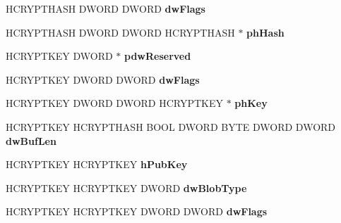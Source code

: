 \begin{DoxyCompactItemize}
\mbox{\label{structtag_p_r_o_v_f_u_n_c_s_a6085b16cb07b46e20649e5b8005e9593}} 
H\+C\+R\+Y\+P\+T\+H\+A\+SH D\+W\+O\+RD D\+W\+O\+RD {\bfseries dw\+Flags}
\item 
\mbox{\label{structtag_p_r_o_v_f_u_n_c_s_a4ac2734584d52da698c7b7cc6686a5df}} 
H\+C\+R\+Y\+P\+T\+H\+A\+SH D\+W\+O\+RD D\+W\+O\+RD H\+C\+R\+Y\+P\+T\+H\+A\+SH $\ast$ {\bfseries ph\+Hash}
\item 
\mbox{\label{structtag_p_r_o_v_f_u_n_c_s_af93daada16a460f279039bfacd00f38a}} 
H\+C\+R\+Y\+P\+T\+K\+EY D\+W\+O\+RD $\ast$ {\bfseries pdw\+Reserved}
\item 
\mbox{\label{structtag_p_r_o_v_f_u_n_c_s_ace287c16bdceea641e3ce7fc519b0694}} 
H\+C\+R\+Y\+P\+T\+K\+EY D\+W\+O\+RD D\+W\+O\+RD {\bfseries dw\+Flags}
\item 
\mbox{\label{structtag_p_r_o_v_f_u_n_c_s_ac38d1bebdec3be33bce14f4bd34ba756}} 
H\+C\+R\+Y\+P\+T\+K\+EY D\+W\+O\+RD D\+W\+O\+RD H\+C\+R\+Y\+P\+T\+K\+EY $\ast$ {\bfseries ph\+Key}
\item 
\mbox{\label{structtag_p_r_o_v_f_u_n_c_s_ae2f036a6da34ca9778984c2fa7574da1}} 
H\+C\+R\+Y\+P\+T\+K\+EY H\+C\+R\+Y\+P\+T\+H\+A\+SH B\+O\+OL D\+W\+O\+RD B\+Y\+TE D\+W\+O\+RD D\+W\+O\+RD {\bfseries dw\+Buf\+Len}
\item 
\mbox{\label{structtag_p_r_o_v_f_u_n_c_s_a60d65d78c57016d613cd7af74bf196d3}} 
H\+C\+R\+Y\+P\+T\+K\+EY H\+C\+R\+Y\+P\+T\+K\+EY {\bfseries h\+Pub\+Key}
\item 
\mbox{\label{structtag_p_r_o_v_f_u_n_c_s_a138eb5f5d3fdde3212fb836e72c70ebc}} 
H\+C\+R\+Y\+P\+T\+K\+EY H\+C\+R\+Y\+P\+T\+K\+EY D\+W\+O\+RD {\bfseries dw\+Blob\+Type}
\item 
\mbox{\label{structtag_p_r_o_v_f_u_n_c_s_a59ebcb110694fb291d0889630f21ba15}} 
H\+C\+R\+Y\+P\+T\+K\+EY H\+C\+R\+Y\+P\+T\+K\+EY D\+W\+O\+RD D\+W\+O\+RD {\bfseries dw\+Flags}
\item 

\end{DoxyCompactItemize}
